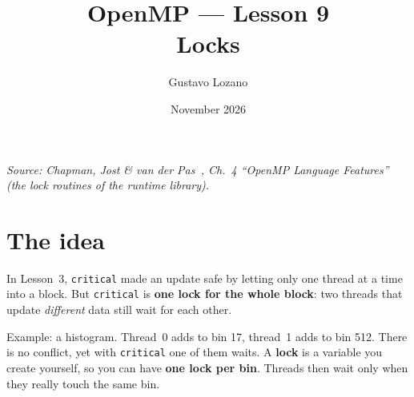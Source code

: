 \documentclass[11pt,a4paper]{article}
\title{\textbf{OpenMP --- Lesson 9}\\[4pt]\large Locks}
\author{Gustavo Lozano}
\date{November 2026}
\begin{document}
\maketitle

\noindent\textit{\small Source: Chapman, Jost \& van der Pas~\cite{chapman}, Ch.~4
``OpenMP Language Features'' (the lock routines of the runtime library).}

\section{The idea}
In Lesson~3, \texttt{critical} made an update safe by letting only one thread at a time
into a block. But \texttt{critical} is \textbf{one lock for the whole block}: two threads
that update \emph{different} data still wait for each other.

Example: a histogram. Thread~0 adds to bin 17, thread~1 adds to bin 512. There is no
conflict, yet with \texttt{critical} one of them waits. A \textbf{lock} is a variable you
create yourself, so you can have \textbf{one lock per bin}. Threads then wait only when they
really touch the same bin.

\begin{center}
\end{center}
\end{document}
